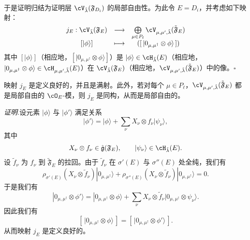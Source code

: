 于是证明归结为证明层 $\cV_{\tilde\lambda}(\mathfrak F_{D_i})$ 的局部自由性。为此令 $E=D_i$，并考虑如下映射：
\[
\begin{array}{ccc}
 j_E:\cV_{\tilde\lambda}(\mathfrak F_E) & \longrightarrow & \bigoplus\limits_{\mu\in P_\ell}\cV_{\mu,\mu',\tilde\lambda}(\tilde{\mathfrak F}_E)\\[3pt]
 \mbox{}[|\phi\rangle] & \longmapsto & ([\,|0_{\mu,\mu^\dagger}\otimes\phi\rangle\,])
\end{array}
\]
其中 $[|\phi\rangle]$（相应地，$[|0_{\mu,\mu^\dagger}\otimes\phi\rangle]$）是 $|\phi\rangle\in\cH_{\tilde\lambda}(E)$（相应地，$|0_{\mu,\mu^\dagger}\otimes\phi\rangle\in\cH_{\mu,\mu',\tilde\lambda}(E)$）在 $\cV_{\tilde\lambda}(\mathfrak F_E)$（相应地，$\cV_{\mu,\mu',\tilde\lambda}(\tilde{\mathfrak F}_E)$）中的像。\hfill$\square$

\begin{lemma}[4.21]
 映射 $j_E$ 是定义良好的，并且是满射。此外，若对每个 $\mu\in P_\ell$，$\cV_{\mu,\mu',\tilde\lambda}(\tilde{\mathfrak F}_E)$ 都是局部自由的 $\cO_E$-模，则 $j_E$ 是同构，从而是局部自由的。
\end{lemma}

\noindent\textit{证明.}\quad 设元素 $|\phi\rangle$ 与 $|\phi'\rangle$ 满足关系
\[
 |\phi'\rangle=|\phi\rangle+\sum_\nu X_\nu\otimes f_\nu|\psi_\nu\rangle,
\]
其中
\[
 X_\nu\otimes f_\nu\in\hat{\mathfrak g}(\mathfrak F_E),\qquad |\psi_\nu\rangle\in\cH_{\tilde\lambda}(E).
\]
设 $\tilde f_\nu$ 为 $f_\nu$ 到 $\tilde{\mathfrak F}_E$ 的拉回。由于 $\tilde f_\nu$ 在 $\sigma'(E)$ 与 $\sigma''(E)$ 处全纯，我们有
\[
 \rho_{\sigma'(E)}(X_\nu\otimes\tilde f_\nu)|0_{\mu,\mu^\dagger}\rangle
 +\rho_{\sigma''(E)}(X_\nu\otimes\tilde f_\nu)|0_{\mu,\mu^\dagger}\rangle=0.
\]
于是我们有
\[
 |0_{\mu,\mu^\dagger}\otimes\phi'\rangle=|0_{\mu,\mu^\dagger}\otimes\phi\rangle
 +\sum_\nu X_\nu\otimes\tilde f_\nu|0_{\mu,\mu^\dagger}\otimes\psi_\nu\rangle.
\]
因此我们有
\[
 [\,|0_{\mu,\mu^\dagger}\otimes\phi\rangle\,]=[\,|0_{\mu,\mu^\dagger}\otimes\phi'\rangle\,].
\]
从而映射 $j_E$ 是定义良好的。


